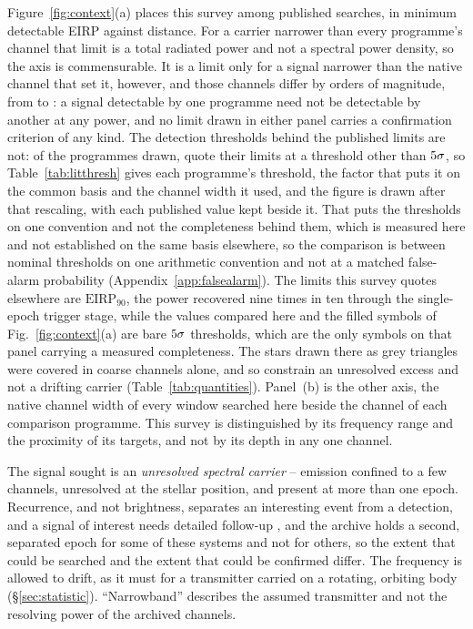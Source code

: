 Figure~\ref{fig:context}(a) places this survey among published searches,
in minimum detectable EIRP against distance. For a carrier narrower than
every programme's channel that limit is a total radiated power and not
a spectral power density, so the axis is commensurable. It is a limit only
for a signal narrower than the native channel that set it, however, and those
channels differ by \LtChanSpanDex{} orders of magnitude, from \LtChanNarrow{}
to \LtChanWide: a signal detectable by one programme need not be detectable
by another at any power, and no limit drawn in either panel carries a
confirmation criterion of any kind. The detection
thresholds behind the published limits are not: of the \LtNProg{}
programmes drawn, \LtNRescaled{} quote their limits at a threshold other
than $5\sigma$, so Table~\ref{tab:litthresh} gives each programme's
threshold, the factor that puts it on the common basis and the channel width
it used, and the figure is drawn after that rescaling, with each published
value kept beside it. That
puts the thresholds on one convention and not the completeness behind them,
which is measured here and not established on the same basis elsewhere, so
the comparison is between nominal thresholds on one arithmetic convention and
not at a matched false-alarm probability
(Appendix~\ref{app:falsealarm}). The limits this survey quotes
elsewhere are $\mathrm{EIRP}_{90}$, the power recovered nine times in ten
through the single-epoch trigger stage, while the values compared here and
the filled symbols of Fig.~\ref{fig:context}(a) are bare
$5\sigma$ thresholds, which are the only symbols on that panel
carrying a measured completeness. The \NgNDecBOnly{} stars drawn there as
grey triangles were covered in coarse channels alone, and so constrain an
unresolved excess and not a drifting carrier
(Table~\ref{tab:quantities}). Panel~(b) is the other axis, the native
channel width of every window searched here beside the channel of each
comparison programme. This survey is distinguished by its frequency range and
the proximity of its targets, and not by its depth in any one channel.

The signal sought is an \emph{unresolved spectral carrier} -- emission confined
to a few channels, unresolved at the stellar position, and present at more
than one epoch. Recurrence, and not brightness, separates an interesting event from a detection, and a signal of interest needs detailed
follow-up \citep{Sheikh2021}, and the archive holds
a second, separated epoch for some of these systems and not for others, so
the extent that could be searched and the extent that could be confirmed differ. The
frequency is allowed to drift, as it must for a transmitter carried on a
rotating, orbiting body (\S\ref{sec:statistic}). ``Narrowband'' describes the
assumed transmitter and not the resolving power of the archived channels.

